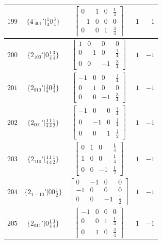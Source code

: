 \documentclass[fleqn,8pt]{jsarticle}
\begin{document}
\begin{longtable}{ccccc}
$ 199 $ & $ \{4^{-}_{\,\,001}{}'|\frac{1}{4} 0 \frac{3}{4}\} $ & $ \begin{bmatrix} 0 & 1 & 0 & \frac{1}{4} \\ -1 & 0 & 0 & 0 \\ 0 & 0 & 1 & \frac{3}{4} \end{bmatrix} $ & $ 1 $ & $ -1 $ \\ \hline
$ 200 $ & $ \{2{}_{100}{}'|0 \frac{1}{4} \frac{3}{4}\} $ & $ \begin{bmatrix} 1 & 0 & 0 & 0 \\ 0 & -1 & 0 & \frac{1}{4} \\ 0 & 0 & -1 & \frac{3}{4} \end{bmatrix} $ & $ 1 $ & $ -1 $ \\ \hline
$ 201 $ & $ \{2{}_{010}{}'|\frac{1}{4} 0 \frac{3}{4}\} $ & $ \begin{bmatrix} -1 & 0 & 0 & \frac{1}{4} \\ 0 & 1 & 0 & 0 \\ 0 & 0 & -1 & \frac{3}{4} \end{bmatrix} $ & $ 1 $ & $ -1 $ \\ \hline
$ 202 $ & $ \{2{}_{001}{}'|\frac{1}{4} \frac{1}{4} \frac{1}{2}\} $ & $ \begin{bmatrix} -1 & 0 & 0 & \frac{1}{4} \\ 0 & -1 & 0 & \frac{1}{4} \\ 0 & 0 & 1 & \frac{1}{2} \end{bmatrix} $ & $ 1 $ & $ -1 $ \\ \hline
$ 203 $ & $ \{2{}_{110}{}'|\frac{1}{4} \frac{1}{4} \frac{1}{2}\} $ & $ \begin{bmatrix} 0 & 1 & 0 & \frac{1}{4} \\ 1 & 0 & 0 & \frac{1}{4} \\ 0 & 0 & -1 & \frac{1}{2} \end{bmatrix} $ & $ 1 $ & $ -1 $ \\ \hline
$ 204 $ & $ \{2{}_{1-10}{}'|0 0 \frac{1}{2}\} $ & $ \begin{bmatrix} 0 & -1 & 0 & 0 \\ -1 & 0 & 0 & 0 \\ 0 & 0 & -1 & \frac{1}{2} \end{bmatrix} $ & $ 1 $ & $ -1 $ \\ \hline
$ 205 $ & $ \{2{}_{011}{}'|0 \frac{1}{4} \frac{3}{4}\} $ & $ \begin{bmatrix} -1 & 0 & 0 & 0 \\ 0 & 0 & 1 & \frac{1}{4} \\ 0 & 1 & 0 & \frac{3}{4} \end{bmatrix} $ & $ 1 $ & $ -1 $ \\ \hline

\end{longtable}
\end{document}
